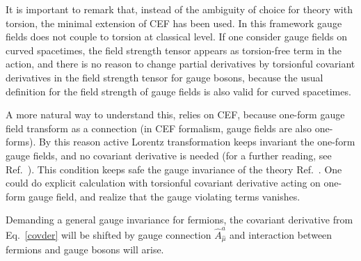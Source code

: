 
It is important to remark that, instead of the ambiguity of choice for theory with torsion, the minimal extension of CEF has been used. In this framework gauge fields does not couple to torsion at classical level. If one consider gauge fields on curved spacetimes, the field strength tensor appears as torsion-free term in the action, and there is no reason to change partial derivatives by torsionful covariant derivatives in the field strength tensor for gauge bosons, because the usual definition for the field strength of gauge fields is also valid for curved spacetimes. 

A more natural way to understand this, relies on CEF, because one-form gauge field transform as a connection (in CEF formalism, gauge fields are also one-forms). By this reason active Lorentz transformation keeps invariant the one-form gauge fields, and no covariant derivative is needed (for a further reading, see Ref.~\cite{Benn:1980ea}). This condition keeps safe the gauge invariance of the theory Ref.~\cite[p.407]{Hehl:1976kj}. One could do explicit calculation with torsionful covariant derivative acting on one-form gauge field, and realize that the gauge violating terms vanishes.

Demanding a general gauge invariance for fermions, the covariant derivative from Eq.~\eqref{covder} will be shifted by gauge connection $\hat{A}_{\hat{\mu}}^a$ and interaction between fermions and gauge bosons will arise.

